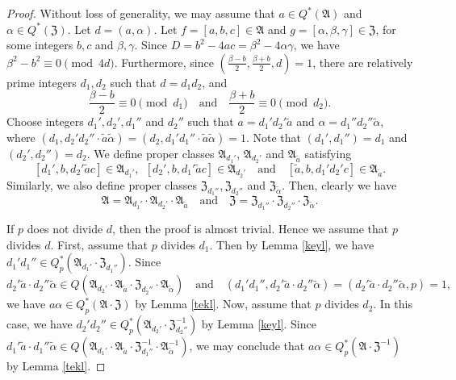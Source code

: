 \documentclass{amsart}
\theoremstyle{definition}
\theoremstyle{remark}
\numberwithin{equation}{section}
\begin{document}
\begin{proof} Without loss of generality, we may assume that $a \in Q^*(\mathfrak A)$ and $\alpha \in Q^*(\mathfrak Z)$. 
Let $d=(a,\alpha)$. Let $f=[a,b,c] \in \mathfrak A$ and $g=[\alpha,\beta,\gamma] \in \mathfrak Z$, for some integers $b,c$ and $\beta,\gamma$. 
Since 
$D=b^2-4ac=\beta^2-4\alpha\gamma$, we have $\beta^2-b^2 \equiv 0 \pmod {4d}$. Furthermore, since $\left(\frac{\beta-b}2,\frac{\beta+b}2,d\right)=1$,  there are relatively prime integers $d_1, d_2$ such that $d=d_1d_2$, and
$$
\frac {\beta-b}2 \equiv 0 \pmod {d_1} \quad \text{and} \quad  \frac {\beta+b}2 \equiv 0 \pmod {d_2}.
$$
Choose integers $d_1', d_2', d_1''$ and $d_2''$ such that $a=d_1'd_2'\widetilde{a}$ and $\alpha=d_1''d_2''\widetilde{\alpha}$, where $(d_1,d_2'd_2''\cdot\widetilde{a}\widetilde{\alpha})=(d_2,d_1'd_1''\cdot\widetilde{a}\widetilde{\alpha})=1$. Note that $(d_1',d_1'')=d_1$ and $(d_2',d_2'')=d_2$.   
We define proper classes $\mathfrak A_{d_1'}$,  $\mathfrak A_{d_2'}$ and $\mathfrak A_{\widetilde{a}} $ satisfying
$$
[d_1',b,d_2'\widetilde{a}c] \in \mathfrak A_{d_1'} ,  \ \   [d_2',b,d_1'\widetilde{a}c] \in \mathfrak A_{d_2'}  \quad \text{and} \quad  [\widetilde{a},b,d_1'd_2'c] \in \mathfrak A_{\widetilde{a}} .
$$
Similarly, we also define proper classes $\mathfrak Z_{d_1''}, \mathfrak Z_{d_2''}$ and $\mathfrak Z_{\widetilde{\alpha}}$. Then, clearly we have 
$$
\mathfrak A=\mathfrak A_{d_1'}\cdot\mathfrak A_{d_2'}\cdot\mathfrak A_{\widetilde{a}} \quad \text{and} \quad \mathfrak Z=\mathfrak Z_{d_1''}\cdot\mathfrak Z_{d_2''}\cdot\mathfrak Z_{\widetilde{\alpha}}.
$$ 

If $p$ does not divide $d$, then the proof is almost trivial. Hence we assume that $p$ divides $d$.   
First, assume that $p$ divides $d_1$. Then by Lemma \ref{keyl}, we have
$d_1'd_1'' \in Q_p^*(\mathfrak A_{d_1'}\cdot\mathfrak Z_{d_1''})$.  Since 
$$
d_2'\widetilde{a}\cdot d_2''\widetilde{\alpha} \in Q(\mathfrak A_{d_2'}\cdot\mathfrak A_{\widetilde{a}}\cdot\mathfrak Z_{d_2''}\cdot\mathfrak A_{\widetilde{\alpha}}) \quad \text{and}  \quad (d_1'd_1'',d_2'\widetilde{a}\cdot d_2''\widetilde{\alpha})=(d_2'\widetilde{a}\cdot d_2''\widetilde{\alpha},p)=1,
$$
  we have $a\alpha \in Q_p^*(\mathfrak A\cdot\mathfrak Z)$ by Lemma \ref{tekl}. Now, assume that $p$ divides $d_2$. In this case, we have
$d_2'd_2'' \in Q_p^*(\mathfrak A_{d_2'}\cdot\mathfrak Z_{d_2''}^{-1})$ by Lemma \ref{keyl}.  Since $d_1'\widetilde{a}\cdot d_1''\widetilde{\alpha} \in Q(\mathfrak A_{d_1'}\cdot\mathfrak A_{\widetilde{a}}\cdot\mathfrak Z_{d_1''}^{-1}\cdot\mathfrak A_{\widetilde{\alpha}}^{-1})$, we may conclude that $a\alpha \in Q_p^*(\mathfrak A\cdot\mathfrak Z^{-1})$ by Lemma \ref{tekl}. 
\end{proof}
\end{document}
